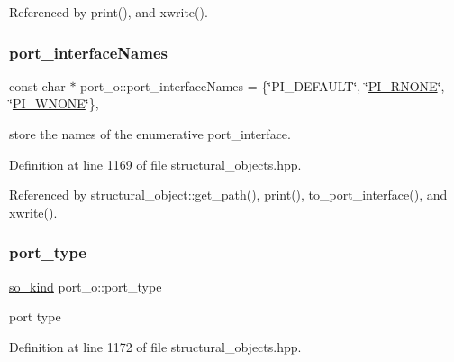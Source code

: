 Referenced by print(), and xwrite().

\mbox{\label{structport__o_a6ebddbc65af6ab89c189ed8bc13d8f5a}} 
\subsubsection{\texorpdfstring{port\+\_\+interface\+Names}{port\_interfaceNames}}
{\footnotesize\ttfamily const char $\ast$ port\+\_\+o\+::port\+\_\+interface\+Names = \{\char`\"{}P\+I\+\_\+\+D\+E\+F\+A\+U\+LT\char`\"{}, \char`\"{}\hyperlink{structport__o_a37d2e6a450aea997028478f5bfb4e1f6aa5d5b465b9d9f94890f1c55454561cec}{P\+I\+\_\+\+R\+N\+O\+NE}\char`\"{}, \char`\"{}\hyperlink{structport__o_a37d2e6a450aea997028478f5bfb4e1f6a7cd12e9159dd94f35a2917f24a6529be}{P\+I\+\_\+\+W\+N\+O\+NE}\char`\"{}\}\hspace{0.3cm}{\ttfamily [static]}, {\ttfamily [private]}}



store the names of the enumerative port\+\_\+interface. 



Definition at line 1169 of file structural\+\_\+objects.\+hpp.



Referenced by structural\+\_\+object\+::get\+\_\+path(), print(), to\+\_\+port\+\_\+interface(), and xwrite().

\mbox{\label{structport__o_a46b110bb20ad95cd76f715b7777f8b01}} 
\subsubsection{\texorpdfstring{port\+\_\+type}{port\_type}}
{\footnotesize\ttfamily \hyperlink{structural__objects_8hpp_acf52399aecacb7952e414c5746ce6439}{so\+\_\+kind} port\+\_\+o\+::port\+\_\+type\hspace{0.3cm}{\ttfamily [private]}}



port type 



Definition at line 1172 of file structural\+\_\+objects.\+hpp.



